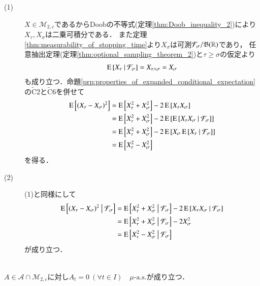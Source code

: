 	\begin{prf}\mbox{}
	\begin{description}
		\item[(1)] 
			$X \in \mathcal{M}_{2,c}$であるからDoobの不等式(定理\ref{thm:Doob_inequality_2})により$X_\tau,X_\sigma$は二乗可積分である．
			また定理\ref{thm:measurability_of_stopping_time}より$X_\sigma$は可測$\mathcal{F}_\sigma/\mathfrak{B}(\mathbb{R})$であり，
			任意抽出定理(定理\ref{thm:optional_sampling_theorem_2})と$\tau \geq \sigma$の仮定より
			\begin{align}
				\operatorname{E} \left[ X_{\tau} \ \middle|\ \mathcal{F}_\sigma \right] = X_{\tau \wedge \sigma} = X_\sigma
			\end{align}
			も成り立つ．命題\ref{prp:properties_of_expanded_conditional_expectation}の$\tilde{\mathrm{C}}$2と$\tilde{\mathrm{C}}$6を併せて
			\begin{align}
				\operatorname{E} \left[ (X_{\tau} - X_{\sigma})^2 \right]
				&= \operatorname{E} \left[ X_{\tau}^2 + X_{\sigma}^2 \right] - 2\operatorname{E} \left[ X_{\tau}X_{\sigma} \right] \\
				&= \operatorname{E} \left[ X_{\tau}^2 + X_{\sigma}^2 \right] - 2\operatorname{E} \left[ \operatorname{E} \left[ X_{\tau}X_{\sigma} \ \middle|\ \mathcal{F}_\sigma \right] \right] \\
				&= \operatorname{E} \left[ X_{\tau}^2 + X_{\sigma}^2 \right] - 2\operatorname{E} \left[ X_{\sigma}\operatorname{E} \left[ X_{\tau} \ \middle|\ \mathcal{F}_\sigma \right] \right] \\
				&= \operatorname{E} \left[ X_{\tau}^2 - X_{\sigma}^2 \right]
			\end{align}
			を得る．
			
		\item[(2)]
			(1)と同様にして
			\begin{align}
				\operatorname{E} \left[ (X_{\tau} - X_{\sigma})^2 \ \middle|\ \mathcal{F}_\sigma \right]
				&= \operatorname{E} \left[ X_{\tau}^2 + X_{\sigma}^2 \ \middle|\ \mathcal{F}_\sigma \right] - 2\operatorname{E} \left[ X_{\tau}X_{\sigma} \ \middle|\ \mathcal{F}_\sigma \right] \\
				&= \operatorname{E} \left[ X_{\tau}^2 + X_{\sigma}^2 \ \middle|\ \mathcal{F}_\sigma \right] - 2X_{\sigma}^2 \\
				&= \operatorname{E} \left[ X_{\tau}^2 - X_{\sigma}^2 \ \middle|\ \mathcal{F}_\sigma \right]
			\end{align}
			が成り立つ．
		\end{description}
		\QED
	\end{prf}
	
	\begin{screen}
		\begin{prp}[有界変動な連続二乗可積分マルチンゲールのパスは定数]\mbox{}\\
			$A \in \mathcal{A} \cap \mathcal{M}_{2,c}$に対し$A_t = 0\ (\forall t \in I)\quad \mbox{$\mu$-a.s.}$が成り立つ．
			\label{prp:bounded_continuous_M_2c_path}
		\end{prp}
	\end{screen}
	
